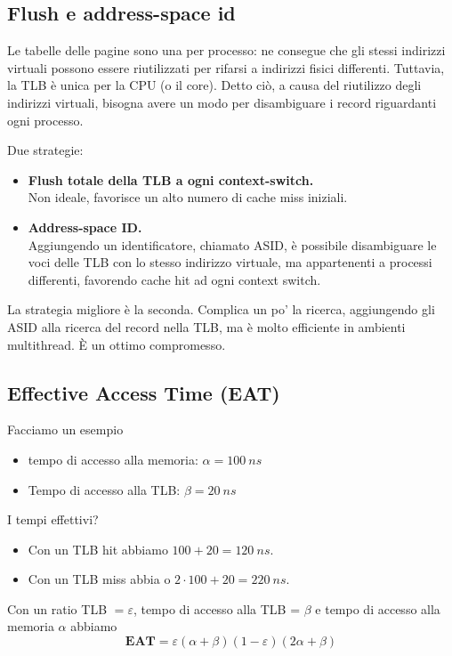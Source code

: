 \documentclass{report}
\begin{document}
\subsection{Flush e address-space id}

Le tabelle delle pagine sono una per processo: ne consegue che gli stessi indirizzi virtuali possono essere riutilizzati per rifarsi a indirizzi fisici differenti. Tuttavia, la TLB è unica per la CPU (o il core). Detto ciò, a causa del riutilizzo degli indirizzi virtuali, bisogna avere un modo per disambiguare i record riguardanti ogni processo.

Due strategie:

\begin{itemize}
    \item \textbf{Flush totale della TLB a ogni context-switch.}\\
    Non ideale, favorisce un alto numero di cache miss iniziali.
    
    \item \textbf{Address-space ID.}\\
    Aggiungendo un identificatore, chiamato ASID, è possibile disambiguare le voci delle TLB con lo stesso indirizzo virtuale, ma appartenenti a processi differenti, favorendo cache hit ad ogni context switch.
\end{itemize}

La strategia migliore è la seconda. Complica un po' la ricerca, aggiungendo gli ASID alla ricerca del record nella TLB, ma è molto efficiente in ambienti multithread. È un ottimo compromesso.

\subsection{Effective Access Time (EAT)}
Facciamo un esempio
\begin{itemize}
    \item tempo di accesso alla memoria: $\alpha= 100 \ ns$

    \item Tempo di accesso alla TLB: $\beta = 20 \ ns$
\end{itemize}
I tempi effettivi?
\begin{itemize}
    \item Con un TLB hit abbiamo $100 + 20 = 120 \ ns$.
    \item Con un TLB miss abbia o $2\cdot100 + 20= 220 \ ns$.
\end{itemize}

Con un ratio TLB $=\varepsilon$, tempo di accesso alla TLB = $\beta$ e tempo di accesso alla memoria $\alpha$ abbiamo
$$
\textbf{EAT}= \varepsilon(\alpha + \beta)(1-\varepsilon)(2\alpha  + \beta)
$$
\end{document}
